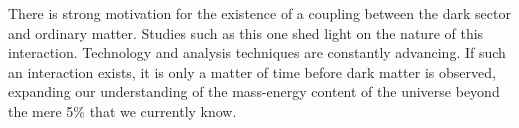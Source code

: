 There is strong motivation for the existence of a coupling between the dark sector and ordinary matter. Studies such as this one shed light on the nature of this interaction. Technology and analysis techniques are constantly advancing. If such an interaction exists, it is only a matter of time before dark matter is observed, expanding our understanding of the mass-energy content of the universe beyond the mere 5\% that we currently know.
